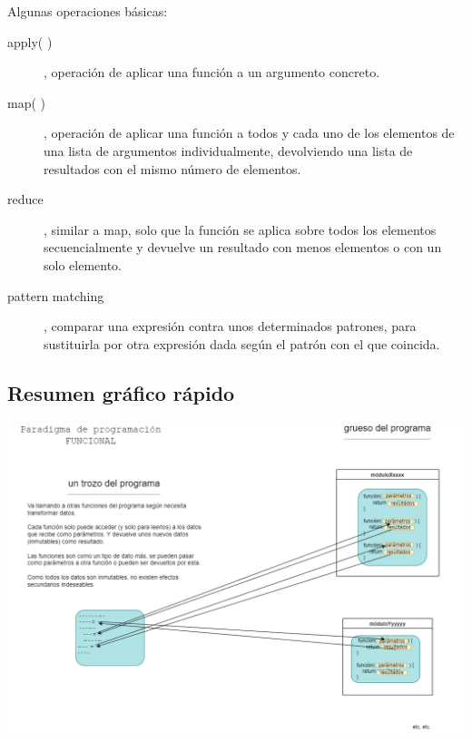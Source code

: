 \documentclass[spanish,12pt,a4paper,final,oneside]{book}
\begin{document}
Algunas operaciones básicas:
\begin{description}
\item[apply( )], operación de aplicar una función a un argumento concreto. 
\item[map( )], operación de aplicar una función a todos y cada uno de los elementos de una lista de argumentos individualmente, devolviendo una lista de resultados con el mismo número de elementos.
\item[reduce], similar a map, solo que la función se aplica sobre todos los elementos secuencialmente y devuelve un resultado con menos elementos o con un solo elemento.
\item[pattern matching], comparar una expresión contra unos determinados patrones, para sustituirla por otra expresión dada según el patrón con el que coincida.
\end{description}


\subsection*{Resumen gráfico rápido}
\includegraphics[width=\textwidth]{Paradigma de programacion - FUNCIONAL}
\end{document}
